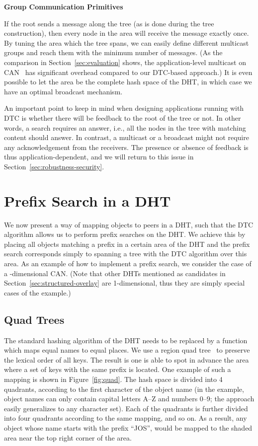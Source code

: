 \documentclass[fleqn,12pt,twoside]{article}
\begin{document}
\noindent
\textbf{Group Communication Primitives}

If the root sends a message along the tree (as is done during the tree
construction), then every node in the area will receive the message
exactly once. By tuning the area which the tree spans, we can easily
define different multicast groups and reach them with the minimum
number of messages. (As the comparison in Section~\ref{sec:evaluation}
shows, the application-level multicast on CAN~\cite{ratnasamy2001alm}
has significant overhead compared to our DTC-based approach.) It is
even possible to let the area be the complete hash space of the DHT,
in which case we have an optimal broadcast mechanism.

An important point to keep in mind when designing applications running
with DTC is whether there will be feedback to the root of the tree or
not. In other words, a search requires an answer, i.e., all the nodes
in the tree with matching content should answer. In contrast, a
multicast or a broadcast might not require any acknowledgement from
the receivers. The presence or absence of feedback is thus
application-dependent, and we will return to this issue in
Section~\ref{sec:robustness-security}. 

\section{Prefix Search in a DHT}
\label{sec:hashing}

We now present a way of mapping objects to peers in a DHT, such that
the DTC algorithm allows us to perform prefix searches on the DHT. We 
achieve this by placing all objects matching a
prefix in a certain area of the DHT and the prefix search corresponds
simply to spanning a tree with the DTC algorithm over this area. As an
example of how to implement a prefix search, we consider the case of a
-dimensional CAN. (Note that other DHTs mentioned as candidates in
Section~\ref{sec:structured-overlay} are 1-dimensional, thus they are
simply special cases of the example.)

\subsection{Quad Trees}
\label{sec:quad-trees}

The standard hashing algorithm of the DHT needs to be replaced by a
function which maps equal names to equal places. We use a region quad
tree~\cite{samet1984qar} to preserve the lexical order of all keys.
The result is one is able to spot in advance the area where a set
of keys with the same prefix is located. One example of such a mapping
is shown in Figure~\ref{fig:quad}. The hash space is divided into 4
quadrants, according to the first character of the object name (in the
example, object names can only contain capital letters A--Z and
numbers 0--9; the approach easily generalizes to any character set).
Each of the quadrants is further divided into four quadrants according
to the same mapping, and so on. As a result, any object whose name
starts with the prefix ``JOS'', would be mapped to the shaded area
near the top right corner of the area.
\end{document}
